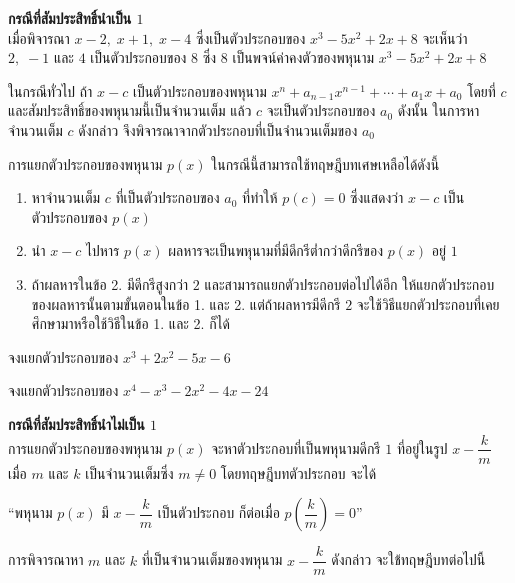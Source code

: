 \vspace{1em}
\noindent\textbf{กรณีที่สัมประสิทธิ์นำเป็น $1$} \\[0.5em]
เมื่อพิจารณา $x-2, \; x+1, \; x-4$ ซึ่งเป็นตัวประกอบของ $x^3 - 5x^2 + 2x + 8$ จะเห็นว่า $2, \; -1$ และ $4$ เป็นตัวประกอบของ $8$ ซึ่ง $8$ เป็นพจน์ค่าคงตัวของพหุนาม $x^3 - 5x^2 + 2x + 8$

ในกรณีทั่วไป ถ้า $x-c$ เป็นตัวประกอบของพหุนาม $x^n + a_{n-1}x^{n-1} + \cdots + a_1x + a_0$ โดยที่ $c$ และสัมประสิทธิ์ของพหุนามนี้เป็นจำนวนเต็ม แล้ว $c$ จะเป็นตัวประกอบของ $a_0$ ดังนั้น ในการหาจำนวนเต็ม $c$ ดังกล่าว จึงพิจารณาจากตัวประกอบที่เป็นจำนวนเต็มของ $a_0$

\vspace{0.5em}
การแยกตัวประกอบของพหุนาม $p(x)$ ในกรณีนี้สามารถใช้ทฤษฎีบทเศษเหลือได้ดังนี้
\begin{conceptbox}
	\begin{enumerate}[label=\arabic*., leftmargin=2em, itemsep=0.4em]
		\item หาจำนวนเต็ม $c$ ที่เป็นตัวประกอบของ $a_0$ ที่ทำให้ $p(c) = 0$ ซึ่งแสดงว่า $x-c$ เป็นตัวประกอบของ $p(x)$
		\item นำ $x-c$ ไปหาร $p(x)$ ผลหารจะเป็นพหุนามที่มีดีกรีต่ำกว่าดีกรีของ $p(x)$ อยู่ $1$
		\item ถ้าผลหารในข้อ 2. มีดีกรีสูงกว่า $2$ และสามารถแยกตัวประกอบต่อไปได้อีก ให้แยกตัวประกอบของผลหารนั้นตามขั้นตอนในข้อ 1. และ 2. แต่ถ้าผลหารมีดีกรี $2$ จะใช้วิธีแยกตัวประกอบที่เคยศึกษามาหรือใช้วิธีในข้อ 1. และ 2. ก็ได้
	\end{enumerate}
\end{conceptbox}

\vspace{1em}

\begin{examplebox}
	จงแยกตัวประกอบของ $x^3 + 2x^2 - 5x - 6$
\end{examplebox}
\solution
\newpage

\begin{examplebox}
	จงแยกตัวประกอบของ $x^4 - x^3 - 2x^2 - 4x - 24$
\end{examplebox}
\solution
\newpage

\noindent\textbf{กรณีที่สัมประสิทธิ์นำไม่เป็น $1$} \\[0.5em]
การแยกตัวประกอบของพหุนาม $p(x)$ จะหาตัวประกอบที่เป็นพหุนามดีกรี $1$ ที่อยู่ในรูป $x - \dfrac{k}{m}$ เมื่อ $m$ และ $k$ เป็นจำนวนเต็มซึ่ง $m \neq 0$ โดยทฤษฎีบทตัวประกอบ จะได้
\begin{center}
	``พหุนาม $p(x)$ มี $x - \dfrac{k}{m}$ เป็นตัวประกอบ ก็ต่อเมื่อ $p\left(\dfrac{k}{m}\right) = 0$''
\end{center}
การพิจารณาหา $m$ และ $k$ ที่เป็นจำนวนเต็มของพหุนาม $x - \dfrac{k}{m}$ ดังกล่าว จะใช้ทฤษฎีบทต่อไปนี้

